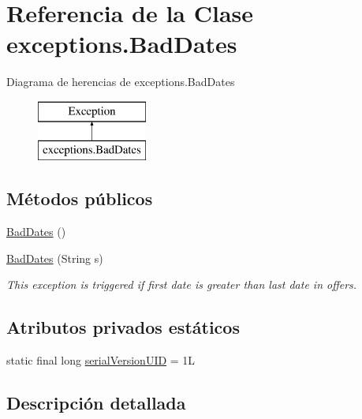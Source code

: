 \hypertarget{classexceptions_1_1_bad_dates}{}\section{Referencia de la Clase exceptions.\+Bad\+Dates}
\label{classexceptions_1_1_bad_dates}
Diagrama de herencias de exceptions.\+Bad\+Dates\begin{figure}[H]
\begin{center}
\leavevmode
\includegraphics[height=2.000000cm]{classexceptions_1_1_bad_dates}
\end{center}
\end{figure}
\subsection*{Métodos públicos}
\begin{DoxyCompactItemize}
\item 
\mbox{\hyperlink{classexceptions_1_1_bad_dates_ad4918ff10b5e46df93774ea9087e6d04}{Bad\+Dates}} ()
\item 
\mbox{\hyperlink{classexceptions_1_1_bad_dates_a34213c984892e85612e3a2e44220e896}{Bad\+Dates}} (String s)
\begin{DoxyCompactList}\small\item\em This exception is triggered if first date is greater than last date in offers. \end{DoxyCompactList}\end{DoxyCompactItemize}
\subsection*{Atributos privados estáticos}
\begin{DoxyCompactItemize}
\item 
static final long \mbox{\hyperlink{classexceptions_1_1_bad_dates_a1703e41273cdde53ece45e307839c449}{serial\+Version\+U\+ID}} = 1L
\end{DoxyCompactItemize}


\subsection{Descripción detallada}


